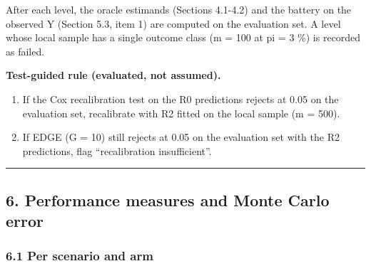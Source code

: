 \documentclass[
  10pt,
]{article}
\providecommand{\tightlist}{%
  \setlength{\itemsep}{0pt}\setlength{\parskip}{0pt}}
\begin{document}
After each level, the oracle estimands (Sections 4.1-4.2)
and the battery on the observed Y (Section 5.3, item 1) are
computed on the evaluation set. A level whose local sample
has a single outcome class (m = 100 at pi = 3 \%) is
recorded as failed.

\textbf{Test-guided rule (evaluated, not assumed).}

\begin{enumerate}
\def\labelenumi{\arabic{enumi}.}
\tightlist
\item
  If the Cox recalibration test on the R0 predictions
  rejects at 0.05 on the evaluation set, recalibrate with R2
  fitted on the local sample (m = 500).
\item
  If EDGE (G = 10) still rejects at 0.05 on the evaluation
  set with the R2 predictions, flag ``recalibration
  insufficient''.
\end{enumerate}

\begin{center}\rule{0.5\linewidth}{0.5pt}\end{center}

\subsection{6. Performance measures and Monte Carlo
error}\label{performance-measures-and-monte-carlo-error}

\subsubsection{6.1 Per scenario and
arm}\label{per-scenario-and-arm}
\end{document}
